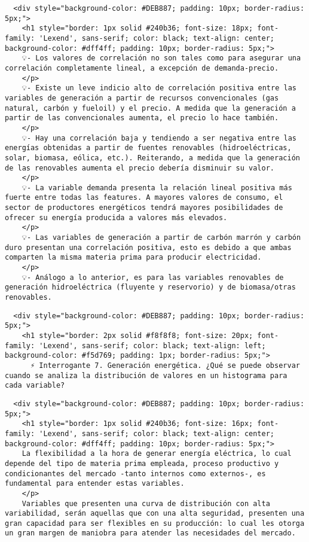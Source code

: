 \documentclass[11pt]{article}
\begin{document}
    \begin{verbatim}
  <div style="background-color: #DEB887; padding: 10px; border-radius: 5px;">
    <h1 style="border: 1px solid #240b36; font-size: 18px; font-family: 'Lexend', sans-serif; color: black; text-align: center; background-color: #dff4ff; padding: 10px; border-radius: 5px;">
    💡- Los valores de correlación no son tales como para asegurar una correlación completamente lineal, a excepción de demanda-precio.
    </p>
    💡- Existe un leve indicio alto de correlación positiva entre las variables de generación a partir de recursos convencionales (gas natural, carbón y fueloil) y el precio. A medida que la generación a partir de las convencionales aumenta, el precio lo hace también.
    </p>
    💡- Hay una correlación baja y tendiendo a ser negativa entre las energías obtenidas a partir de fuentes renovables (hidroeléctricas, solar, biomasa, eólica, etc.). Reiterando, a medida que la generación de las renovables aumenta el precio debería disminuir su valor.
    </p>
    💡- La variable demanda presenta la relación lineal positiva más fuerte entre todas las features. A mayores valores de consumo, el sector de productores energéticos tendrá mayores posibilidades de ofrecer su energía producida a valores más elevados.
    </p>
    💡- Las variables de generación a partir de carbón marrón y carbón duro presentan una correlación positiva, esto es debido a que ambas comparten la misma materia prima para producir electricidad.
    </p>
    💡- Análogo a lo anterior, es para las variables renovables de generación hidroeléctrica (fluyente y reservorio) y de biomasa/otras renovables.
\end{verbatim}

    \begin{verbatim}
  <div style="background-color: #DEB887; padding: 10px; border-radius: 5px;">
    <h1 style="border: 2px solid #f8f8f8; font-size: 20px; font-family: 'Lexend', sans-serif; color: black; text-align: left; background-color: #f5d769; padding: 1px; border-radius: 5px;">
      ⚡ Interrogante 7. Generación energética. ¿Qué se puede observar cuando se analiza la distribución de valores en un histograma para cada variable?
\end{verbatim}

    \begin{verbatim}
  <div style="background-color: #DEB887; padding: 10px; border-radius: 5px;">
    <h1 style="border: 1px solid #240b36; font-size: 16px; font-family: 'Lexend', sans-serif; color: black; text-align: center; background-color: #dff4ff; padding: 10px; border-radius: 5px;">
    La flexibilidad a la hora de generar energía eléctrica, lo cual depende del tipo de materia prima empleada, proceso productivo y condicionantes del mercado -tanto internos como externos-, es fundamental para entender estas variables.
    </p>
    Variables que presenten una curva de distribución con alta variabilidad, serán aquellas que con una alta seguridad, presenten una gran capacidad para ser flexibles en su producción: lo cual les otorga un gran margen de maniobra para atender las necesidades del mercado.
\end{verbatim}
\end{document}
